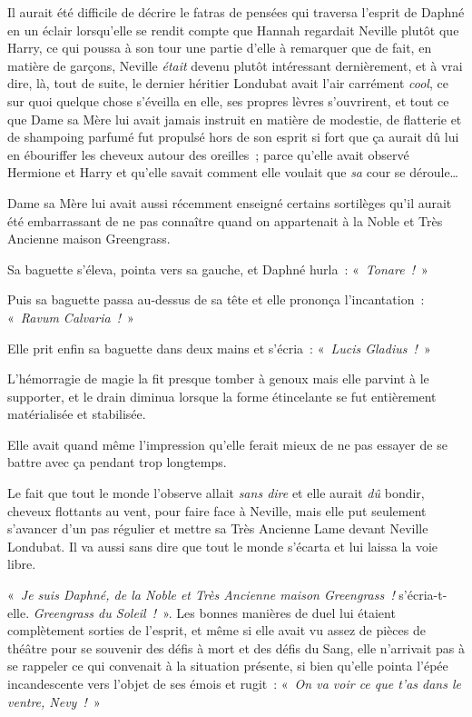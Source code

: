 Il aurait été difficile de décrire le fatras de pensées qui traversa l'esprit de Daphné en un éclair lorsqu'elle se rendit compte que Hannah regardait Neville plutôt que Harry, ce qui poussa à son tour une partie d'elle à remarquer que de fait, en matière de garçons, Neville \emph{était} devenu plutôt intéressant dernièrement, et à vrai dire, là, tout de suite, le dernier héritier Londubat avait l'air carrément \emph{cool}, ce sur quoi quelque chose s'éveilla en elle, ses propres lèvres s'ouvrirent, et tout ce que Dame sa Mère lui avait jamais instruit en matière de modestie, de flatterie et de shampoing parfumé fut propulsé hors de son esprit si fort que ça aurait dû lui en ébouriffer les cheveux autour des oreilles~; parce qu'elle avait observé Hermione et Harry et qu'elle savait comment elle voulait que \emph{sa} cour se déroule…

Dame sa Mère lui avait aussi récemment enseigné certains sortilèges qu'il aurait été embarrassant de ne pas connaître quand on appartenait à la Noble et Très Ancienne maison Greengrass.

Sa baguette s'éleva, pointa vers sa gauche, et Daphné hurla~: «~\emph{Tonare~!}~»

Puis sa baguette passa au-dessus de sa tête et elle prononça l'incantation~: «~\emph{Ravum Calvaria~!}~»

Elle prit enfin sa baguette dans deux mains et s'écria~: «~\emph{Lucis Gladius~!}~»

L'hémorragie de magie la fit presque tomber à genoux mais elle parvint à le supporter, et le drain diminua lorsque la forme étincelante se fut entièrement matérialisée et stabilisée.

Elle avait quand même l'impression qu'elle ferait mieux de ne pas essayer de se battre avec ça pendant trop longtemps.

Le fait que tout le monde l'observe allait \emph{sans dire} et elle aurait \emph{dû} bondir, cheveux flottants au vent, pour faire face à Neville, mais elle put seulement s'avancer d'un pas régulier et mettre sa Très Ancienne Lame devant Neville Londubat. Il va aussi sans dire que tout le monde s'écarta et lui laissa la voie libre.

«~\emph{Je suis Daphné, de la Noble et Très Ancienne maison Greengrass~!} s'écria-t-elle. \emph{Greengrass du Soleil~!}~». Les bonnes manières de duel lui étaient complètement sorties de l'esprit, et même si elle avait vu assez de pièces de théâtre pour se souvenir des défis à mort et des défis du Sang, elle n'arrivait pas à se rappeler ce qui convenait à la situation présente, si bien qu'elle pointa l'épée incandescente vers l'objet de ses émois et rugit~: «~\emph{On va voir ce que t'as dans le ventre, Nevy~!}~»

